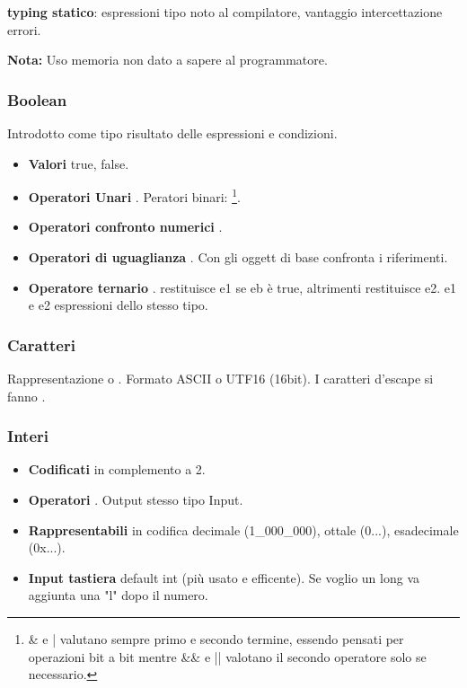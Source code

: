 \textbf{typing statico}: espressioni tipo noto al compilatore, vantaggio intercettazione errori.

\textbf{Nota:} Uso memoria non dato a sapere al programmatore.

\subsubsection{Boolean}
Introdotto come tipo risultato delle espressioni e condizioni.
\begin{itemize}
	\item \textbf{Valori} true, false.
	\item \textbf{Operatori Unari} . Peratori binari: \footnote{\& e | valutano sempre primo e secondo termine, essendo pensati per operazioni bit a bit mentre \&\& e || valotano il secondo operatore solo se necessario.}.
	\item \textbf{Operatori confronto numerici} \inline{<, >, <=, >=}.
	\item \textbf{Operatori di uguaglianza} \inline{==, !=}. Con gli oggett di base confronta i riferimenti.
	\item \textbf{Operatore ternario} . restituisce e1 se eb è true, altrimenti restituisce e2. e1 e e2 espressioni dello stesso tipo.
\end{itemize}

\subsubsection{Caratteri}
Rappresentazione  o . Formato ASCII o UTF16 (16bit). I caratteri d'escape si fanno .

\subsubsection{Interi}
\begin{itemize}
	\item \textbf{Codificati} in complemento a 2.
	\item \textbf{Operatori} . Output stesso tipo Input.
	\item \textbf{Rappresentabili} in codifica decimale (1\_000\_000), ottale (0...), esadecimale (0x...).
	\item \textbf{Input tastiera} default int (più usato e efficente). Se voglio un long va aggiunta una "l" dopo il numero.
\end{itemize}


